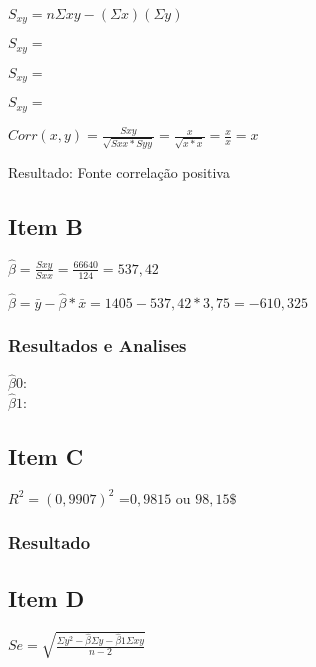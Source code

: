 \documentclass{article}
\begin{document}
\begin{flushleft}

$S_{xy} = n\Sigma xy-(\Sigma x)(\Sigma y)$

$S_{xy} = $

$S_{xy} =$ 

$S_{xy} =$ 

\end{flushleft}

\begin{flushleft}
    $Corr(x,y) = \frac{Sxy}{\sqrt{Sxx * Syy}} = \frac{x}{\sqrt{x * x}} = \frac{x}{x} = x $

\end{flushleft}

Resultado: Fonte correlação positiva

\subsection{Item B}

\begin{flushleft}

    $\hat{\beta} = \frac{Sxy}{Sxx} = \frac{66640}{124} = 537,42$

    $\hat{\beta} = \bar{y} - \hat{\beta} * \bar{x} = 1405 -537,42 * 3,75 = -610,325$
\end{flushleft}

\subsubsection{Resultados e Analises}

$\hat{\beta}0 $:  \\    
$\hat{\beta}1 $: 

\subsection{Item C}

\begin{flushleft}
    $R^2 = (0,9907)^2$ =$0,9815$ ou $98,15\$$
\end{flushleft}

\subsubsection{Resultado}


\subsection{Item D}
\begin{flushleft}
$Se = \sqrt{ \frac{\Sigma y^2 - \hat{\beta } \Sigma y - \hat{\beta}1 \Sigma xy }{n-2}}$
\end{flushleft}   
\end{document}
